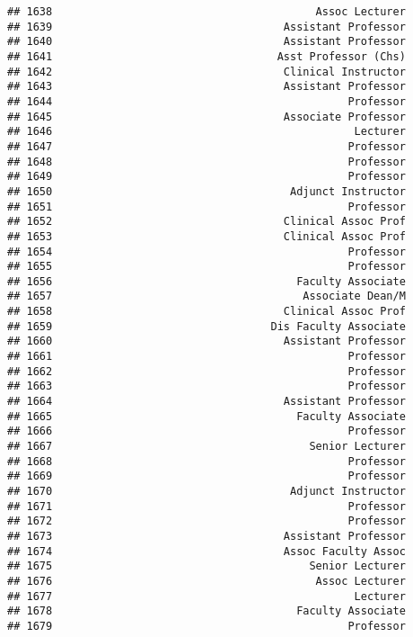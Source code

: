 \documentclass[
]{article}
\begin{document}
\begin{verbatim}
## 1638                                         Assoc Lecturer
## 1639                                    Assistant Professor
## 1640                                    Assistant Professor
## 1641                                   Asst Professor (Chs)
## 1642                                    Clinical Instructor
## 1643                                    Assistant Professor
## 1644                                              Professor
## 1645                                    Associate Professor
## 1646                                               Lecturer
## 1647                                              Professor
## 1648                                              Professor
## 1649                                              Professor
## 1650                                     Adjunct Instructor
## 1651                                              Professor
## 1652                                    Clinical Assoc Prof
## 1653                                    Clinical Assoc Prof
## 1654                                              Professor
## 1655                                              Professor
## 1656                                      Faculty Associate
## 1657                                       Associate Dean/M
## 1658                                    Clinical Assoc Prof
## 1659                                  Dis Faculty Associate
## 1660                                    Assistant Professor
## 1661                                              Professor
## 1662                                              Professor
## 1663                                              Professor
## 1664                                    Assistant Professor
## 1665                                      Faculty Associate
## 1666                                              Professor
## 1667                                        Senior Lecturer
## 1668                                              Professor
## 1669                                              Professor
## 1670                                     Adjunct Instructor
## 1671                                              Professor
## 1672                                              Professor
## 1673                                    Assistant Professor
## 1674                                    Assoc Faculty Assoc
## 1675                                        Senior Lecturer
## 1676                                         Assoc Lecturer
## 1677                                               Lecturer
## 1678                                      Faculty Associate
## 1679                                              Professor

\end{verbatim}
\end{document}
